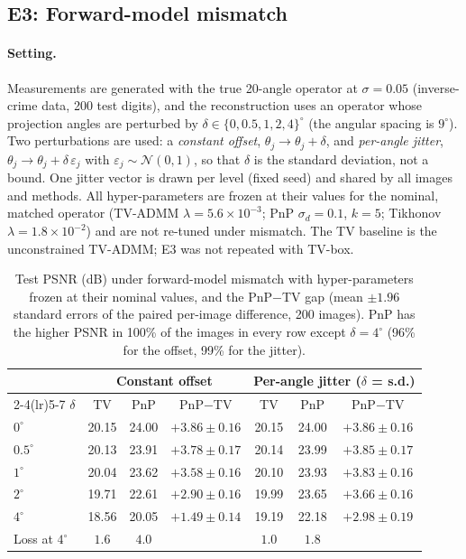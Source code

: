 \subsection{E3: Forward-model mismatch}\label{sec:e3}
\paragraph{Setting.}
Measurements are generated with the true 20-angle operator at $\sigma=0.05$ (inverse-crime data, 200 test digits), and the reconstruction uses an operator whose projection angles are
perturbed by $\delta\in\{0,0.5,1,2,4\}^\circ$ (the angular spacing is $9^\circ$). Two perturbations are used: a \emph{constant offset}, $\theta_j\to\theta_j+\delta$, and \emph{per-angle jitter},
$\theta_j\to\theta_j+\delta\,\varepsilon_j$ with $\varepsilon_j\sim\mathcal{N}(0,1)$, so that $\delta$ is the standard deviation, not a bound. One jitter vector is drawn per level (fixed seed) and shared by all images and methods.
All hyper-parameters are frozen at their values for the nominal, matched operator (TV-ADMM $\lambda=5.6\times10^{-3}$; PnP $\sigma_d=0.1$, $k=5$; Tikhonov $\lambda=1.8\times10^{-2}$) and are not re-tuned under mismatch.
The TV baseline is the unconstrained TV-ADMM; E3 was not repeated with TV-box.

\begin{table}[htbp]
\centering\small\setlength{\tabcolsep}{4pt}
\caption{Test PSNR (dB) under forward-model mismatch with hyper-parameters frozen at their nominal values, and the PnP$-$TV gap (mean $\pm1.96$ standard errors of the paired per-image difference, 200 images).
PnP has the higher PSNR in 100\% of the images in every row except $\delta=4^\circ$ (96\% for the offset, 99\% for the jitter).}
\label{tab:e3}
\begin{tabular}{lcccccc}
\toprule
 & \multicolumn{3}{c}{Constant offset} & \multicolumn{3}{c}{Per-angle jitter ($\delta$ = s.d.)}\\
\cmidrule(lr){2-4}\cmidrule(lr){5-7}
$\delta$ & TV & PnP & PnP$-$TV & TV & PnP & PnP$-$TV \\
\midrule
$0^\circ$   & 20.15 & 24.00 & $+3.86\pm0.16$ & 20.15 & 24.00 & $+3.86\pm0.16$ \\
$0.5^\circ$ & 20.13 & 23.91 & $+3.78\pm0.17$ & 20.14 & 23.99 & $+3.85\pm0.17$ \\
$1^\circ$   & 20.04 & 23.62 & $+3.58\pm0.16$ & 20.10 & 23.93 & $+3.83\pm0.16$ \\
$2^\circ$   & 19.71 & 22.61 & $+2.90\pm0.16$ & 19.99 & 23.65 & $+3.66\pm0.16$ \\
$4^\circ$   & 18.56 & 20.05 & $+1.49\pm0.14$ & 19.19 & 22.18 & $+2.98\pm0.19$ \\
\midrule
Loss at $4^\circ$ & $1.6$ & $4.0$ & & $1.0$ & $1.8$ & \\
\bottomrule
\end{tabular}
\end{table}

